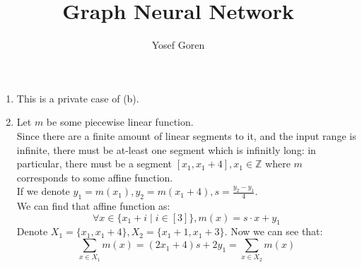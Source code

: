 \documentclass{article}
\begin{document}
\author{Yosef Goren}
\title{Graph Neural Network}
\maketitle
\setcounter{section}{1}
\section{}
\begin{enumerate}[label=(\alph*)]
    \item This is a private case of (b).
    \item Let $m$ be some piecewise linear function.\\
        Since there are a finite amount of linear segments to it,
        and the input range is infinite, there must be at-least
        one segment which is infinitly long: in particular,
        there must be a segment $[x_1,x_1+4], x_1\in\mathbb{Z}$
        where $m$ corresponds to some affine function.\\
        If we denote $y_1=m(x_1), y_2=m(x_1+4), s = \frac{y_2-y_1}{4}$.\\
        We can find that affine function as:
        \[
            \forall x\in \{x_1+i\mid i\in[3]\}, m(x)=s\cdot x+y_1
        \]
        Denote $X_1=\{x_1,x_1+4\}, X_2=\{x_1+1,x_1+3\}$.
        Now we can see that:
        \[
            \sum_{x\in X_1}m(x)=
            (2x_1+4)s+2y_1=
            \sum_{x\in X_2}m(x)
        \]
\end{enumerate}
\end{document}
